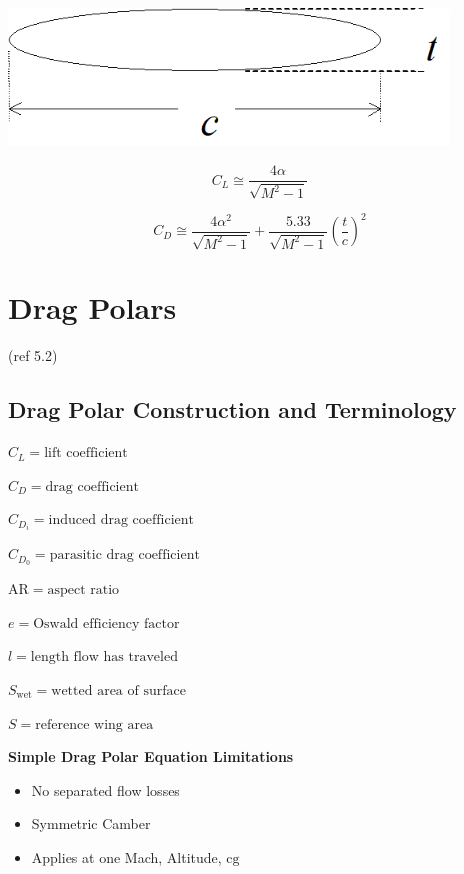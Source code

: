 \documentclass[
]{book}
\providecommand{\tightlist}{%
  \setlength{\itemsep}{0pt}\setlength{\parskip}{0pt}}
\begin{document}
\includegraphics[width=4.596in,height=1.444in]{media/05/image72.png}

\[C_L \cong \frac{4 \alpha}{\sqrt{M^2 - 1} }\]

\[C_D \cong \frac{4 \alpha^2}{\sqrt{M^2 - 1}} + \frac{5.33}{\sqrt{M^2 - 1}}\left(\frac{t}{c}\right)^2\]

\hypertarget{drag-polars}{%
\section{Drag Polars}\label{drag-polars}}

(ref 5.2)

\hypertarget{drag-polar-construction-and-terminology}{%
\subsection{Drag Polar Construction and Terminology}\label{drag-polar-construction-and-terminology}}

\(C_L = \text{lift coefficient}\)

\(C_D = \text{drag coefficient}\)

\(C_{D_i} = \text{induced drag coefficient}\)

\(C_{D_0} = \text{parasitic drag coefficient}\)

\(\mathrm{AR} = \text{aspect ratio}\)

\(e = \text{Oswald efficiency factor}\)

\(l = \text{length flow has traveled}\)

\(S_{\mathrm{wet}} = \text{wetted area of surface}\)

\(S = \text{reference wing area}\)

\textbf{Simple Drag Polar Equation Limitations}

\begin{itemize}
\tightlist
\item
  No separated flow losses
\item
  Symmetric Camber
\item
  Applies at one Mach, Altitude, \(\mathrm{cg}\)
\end{itemize}
\end{document}
